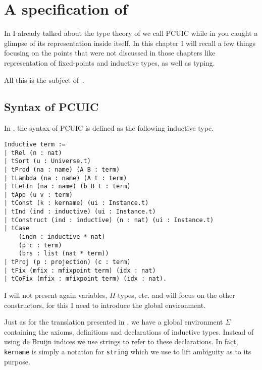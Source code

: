 \chapter{A specification of \Coq}

In  I already talked about the type theory of \Coq we call
\acrshort{PCUIC} while in  you caught a glimpse of its
representation inside \Coq itself. In this chapter I will recall a few things
focusing on the points that were not discussed in those chapters like
representation of fixed-points and inductive types, as well as typing.

All this is the subject of~.

\section{Syntax of \acrshort{PCUIC}}

In \MetaCoq, the syntax of \acrshort{PCUIC} is defined as the following
inductive type.
\begin{verbatim}
Inductive term :=
| tRel (n : nat)
| tSort (u : Universe.t)
| tProd (na : name) (A B : term)
| tLambda (na : name) (A t : term)
| tLetIn (na : name) (b B t : term)
| tApp (u v : term)
| tConst (k : kername) (ui : Instance.t)
| tInd (ind : inductive) (ui : Instance.t)
| tConstruct (ind : inductive) (n : nat) (ui : Instance.t)
| tCase
    (indn : inductive * nat)
    (p c : term)
    (brs : list (nat * term))
| tProj (p : projection) (c : term)
| tFix (mfix : mfixpoint term) (idx : nat)
| tCoFix (mfix : mfixpoint term) (idx : nat).
\end{verbatim}

I will not present again variables, \(\Pi\)-types, etc. and will focus on
the other constructors, for this I need to introduce the global environment.


Just as for the translation presented in , we have
a global environment \(\Sigma\) containing the axioms, definitions and
declarations of inductive types. Instead of using de Bruijn indices we use
strings to refer to these declarations. In fact, \texttt{kername}
is simply a notation for \texttt{string} which we use to lift
ambiguity as to its purpose.


